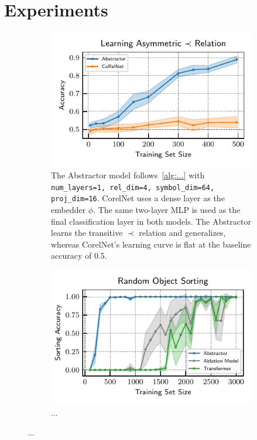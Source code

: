 
\section{Experiments}\label{sec:experiments}

\begin{figure}
    \centering
    \begin{subfigure}[t]{0.45\textwidth}
        \centering
        \includegraphics{figures/experiments/pairwise_order_learning_curves.pdf}
        \caption{The Abstractor model follows~\cref{alg:...} with \texttt{num\_layers=1, rel\_dim=4, symbol\_dim=64, proj\_dim=16}. CorelNet uses a dense layer as the embedder $\phi$. The same two-layer MLP is used as the final classification layer in both models. The Abstractor learns the transitive $\prec$ relation and generalizes, whereas CorelNet's learning curve is flat at the baseline accuracy of 0.5.}\label{fig:exp_order_relation}
    \end{subfigure} \hspace{\fill}
    \begin{subfigure}[t]{0.45\textwidth}
        \centering
        \includegraphics{figures/experiments/random_object_sorting.pdf}
        \caption{...}\label{fig:object_sorting}
    \end{subfigure}


\end{figure}
